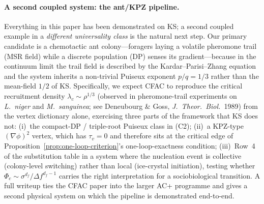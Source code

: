 \documentclass[11pt,a4paper]{article}
\theoremstyle{plain}
\begin{document}
\paragraph{A second coupled system: the ant/KPZ pipeline.}
Everything in this paper has been demonstrated on KS; a second
coupled example in a \emph{different universality class} is the
natural next step.  Our primary candidate is a chemotactic ant
colony---foragers laying a volatile pheromone trail (MSR field)
while a discrete population (DP) senses its gradient---because
in the continuum limit the trail field is described by the
Kardar--Parisi--Zhang equation~\citep{KPZ1986} and the system
inherits a non-trivial Puiseux exponent $p/q = 1/3$ rather than
the mean-field $1/2$ of KS.  Specifically, we expect CFAC to
reproduce the critical recruitment density
$\lambda_c \sim \rho^{1/3}$ (observed in pheromone-trail
experiments on \textit{L.\ niger} and \textit{M.\ sanguinea}; see
Deneubourg \& Goss, \textit{J.\ Theor.\ Biol.}\ 1989) from the
vertex dictionary alone, exercising three parts of the framework
that KS does not: (i)~the compact-DP / triple-root Puiseux class
in (C2); (ii)~a KPZ-type $(\nabla\phi)^2$ vertex, which has
$\tau_v = 0$ and therefore sits at the critical edge of
Proposition~\ref{prop:one-loop-criterion}'s one-loop-exactness
condition; (iii)~Row~4 of the substitution table in a system
where the nucleation event is collective (colony-level
switching) rather than local (ice-crystal initiation), testing
whether $\Phi_c \sim \sigma^{d_f}/\Delta f^{d_f - 1}$ carries the
right interpretation for a sociobiological transition.  A full
writeup ties the CFAC paper into the larger AC+ programme and
gives a second physical system on which the pipeline is
demonstrated end-to-end.
\end{document}

